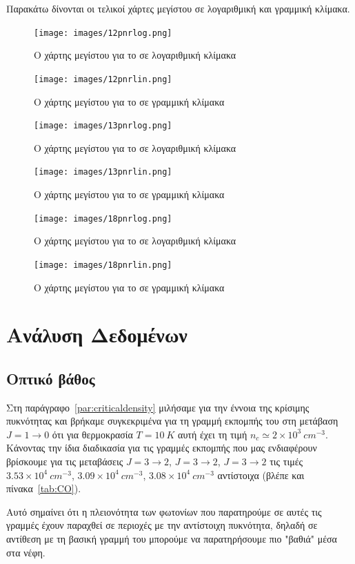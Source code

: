 \documentclass[a4paper,12pt]{memoir}
\newcommand{\e}[1]{\times 10^{#1}}
\begin{document}
Παρακάτω δίνονται οι τελικοί χάρτες μεγίστου σε λογαριθμική και γραμμική κλίμακα.

\begin{figure}[hb]
	\centering
	\texttt{[image: images/12pnrlog.png]}
	\caption{Ο χάρτης μεγίστου για το  σε λογαριθμική κλίμακα}

	\centering
	\texttt{[image: images/12pnrlin.png]}
	\caption{Ο χάρτης μεγίστου για το  σε γραμμική κλίμακα}
\end{figure}

\begin{figure}[hb]
	\centering
		\texttt{[image: images/13pnrlog.png]}
		\caption{Ο χάρτης μεγίστου για το  σε λογαριθμική κλίμακα}


	\centering
	\texttt{[image: images/13pnrlin.png]}
	\caption{Ο χάρτης μεγίστου για το  σε γραμμική κλίμακα}
\end{figure}

\begin{figure}[hb]
	\centering
	\texttt{[image: images/18pnrlog.png]}
	\caption{Ο χάρτης μεγίστου για το  σε λογαριθμική κλίμακα}


	\centering
	\texttt{[image: images/18pnrlin.png]}
	\caption{Ο χάρτης μεγίστου για το  σε γραμμική κλίμακα}
\end{figure}

\chapter{Ανάλυση Δεδομένων}

\section{Οπτικό βάθος}
\label{par:od}
Στη παράγραφο~\ref{par:criticaldensity} μιλήσαμε για την έννοια της κρίσιμης πυκνότητας και βρήκαμε συγκεκριμένα για τη γραμμή εκπομπής του  στη μετάβαση $J=1\to 0$ ότι για θερμοκρασία $T=10\ K$ αυτή έχει τη τιμή $n_c \simeq 2\e{3} \ cm^{-3}$. 
Κάνοντας την ίδια διαδικασία για τις γραμμές εκπομπής που μας ενδιαφέρουν βρίσκουμε για τις μεταβάσεις  $J=3\to 2$,  $J=3\to 2$,  $J=3\to 2$ τις τιμές $3.53\e{4}\ cm^{-3}$, $3.09\e{4}\ cm^{-3}$, $3.08\e{4}\ cm^{-3}$ αντίστοιχα (βλέπε και πίνακα~\ref{tab:CO}).

Αυτό σημαίνει ότι η πλειονότητα των φωτονίων που παρατηρούμε σε αυτές τις γραμμές έχουν παραχθεί σε περιοχές με την αντίστοιχη πυκνότητα, δηλαδή σε αντίθεση με τη βασική γραμμή του  μπορούμε να παρατηρήσουμε πιο "βαθιά" μέσα στα νέφη.
\end{document}
